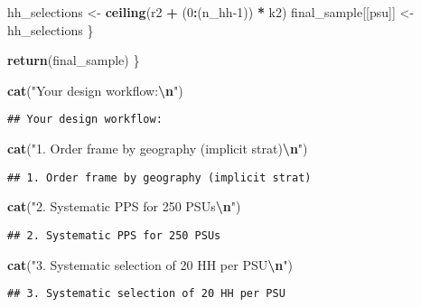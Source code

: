 \documentclass[
]{article}
\newenvironment{Shaded}{\begin{snugshade}}{\end{snugshade}}
\newcommand{\DecValTok}[1]{\textcolor[rgb]{0.00,0.00,0.81}{#1}}
\newcommand{\FunctionTok}[1]{\textcolor[rgb]{0.13,0.29,0.53}{\textbf{#1}}}
\newcommand{\NormalTok}[1]{#1}
\newcommand{\OtherTok}[1]{\textcolor[rgb]{0.56,0.35,0.01}{#1}}
\newcommand{\SpecialCharTok}[1]{\textcolor[rgb]{0.81,0.36,0.00}{\textbf{#1}}}
\newcommand{\StringTok}[1]{\textcolor[rgb]{0.31,0.60,0.02}{#1}}
\begin{document}
\begin{Shaded}
\begin{Highlighting}[]
\NormalTok{    hh\_selections }\OtherTok{\textless{}{-}} \FunctionTok{ceiling}\NormalTok{(r2 }\SpecialCharTok{+}\NormalTok{ (}\DecValTok{0}\SpecialCharTok{:}\NormalTok{(n\_hh}\DecValTok{{-}1}\NormalTok{)) }\SpecialCharTok{*}\NormalTok{ k2)}
\NormalTok{    final\_sample[[psu]] }\OtherTok{\textless{}{-}}\NormalTok{ hh\_selections}
\NormalTok{  \}}
  
  \FunctionTok{return}\NormalTok{(final\_sample)}
\NormalTok{\}}

\FunctionTok{cat}\NormalTok{(}\StringTok{"Your design workflow:}\SpecialCharTok{\textbackslash{}n}\StringTok{"}\NormalTok{)}
\end{Highlighting}
\end{Shaded}

\begin{verbatim}
## Your design workflow:
\end{verbatim}

\begin{Shaded}
\begin{Highlighting}[]
\FunctionTok{cat}\NormalTok{(}\StringTok{"1. Order frame by geography (implicit strat)}\SpecialCharTok{\textbackslash{}n}\StringTok{"}\NormalTok{)}
\end{Highlighting}
\end{Shaded}

\begin{verbatim}
## 1. Order frame by geography (implicit strat)
\end{verbatim}

\begin{Shaded}
\begin{Highlighting}[]
\FunctionTok{cat}\NormalTok{(}\StringTok{"2. Systematic PPS for 250 PSUs}\SpecialCharTok{\textbackslash{}n}\StringTok{"}\NormalTok{)}
\end{Highlighting}
\end{Shaded}

\begin{verbatim}
## 2. Systematic PPS for 250 PSUs
\end{verbatim}

\begin{Shaded}
\begin{Highlighting}[]
\FunctionTok{cat}\NormalTok{(}\StringTok{"3. Systematic selection of 20 HH per PSU}\SpecialCharTok{\textbackslash{}n}\StringTok{"}\NormalTok{)}
\end{Highlighting}
\end{Shaded}

\begin{verbatim}
## 3. Systematic selection of 20 HH per PSU
\end{verbatim}
\end{document}
